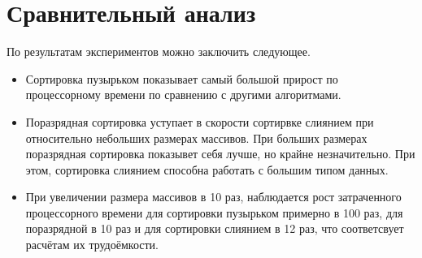 \section*{Сравнительный анализ}
По результатам экспериментов можно заключить следующее.
\begin{itemize}
	\item Сортировка пузырьком показывает самый большой прирост по процессорному времени по сравнению с другими алгоритмами.
	\item Поразрядная сортировка уступает в скорости сортирвке слиянием при относительно небольших размерах массивов. При больших размерах поразрядная сортировка показывет себя лучше, но крайне незначительно. При этом, сортировка слиянием способна работать с большим типом данных.
	\item При увеличении размера массивов в 10 раз, наблюдается рост затраченного процессорного времени для сортировки пузырьком примерно в 100 раз, для поразрядной в 10 раз и для сортировки слиянием в 12 раз, что соответсвует расчётам их трудоёмкости.
\end{itemize}


	